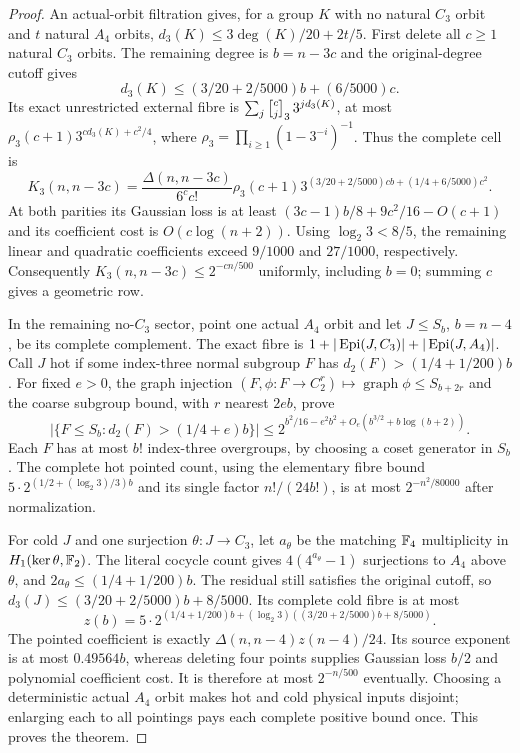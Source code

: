 \begin{proof}
An actual-orbit filtration gives, for a group $K$ with no natural
$C_3$ orbit and $t$ natural $A_4$ orbits,
$d_3(K)\leq3\deg(K)/20+2t/5$.
First delete all $c\geq1$ natural $C_3$ orbits. The remaining
degree is $b=n-3c$ and the original-degree cutoff gives
\[
 d_3(K)\leq(3/20+2/5000)b+(6/5000)c.
\]
Its exact unrestricted external fibre is
$\sum_j\gauss cj3\,3^{jd_3(K)}$, at most
$\rho_3(c+1)3^{cd_3(K)+c^2/4}$, where
$\rho_3=\prod_{i\geq1}(1-3^{-i})^{-1}$.
Thus the complete cell is
\[
 K_3(n,n-3c)=\frac{\Delta(n,n-3c)}{6^cc!}\rho_3(c+1)
  3^{(3/20+2/5000)cb+(1/4+6/5000)c^2}.
\]
At both parities its Gaussian loss is at least
$(3c-1)b/8+9c^2/16-O(c+1)$ and its coefficient cost is
$O(c\log(n+2))$. Using $\log_2 3<8/5$, the remaining
linear and quadratic coefficients exceed $9/1000$ and $27/1000$,
respectively. Consequently $K_3(n,n-3c)\leq2^{-cn/500}$
uniformly, including $b=0$; summing $c$ gives a geometric row.

In the remaining no-$C_3$ sector, point one actual $A_4$ orbit
and let $J\leq S_b$, $b=n-4$, be its complete complement.
The exact fibre is $1+|\operatorname{Epi}(J,C_3)|+|\operatorname{Epi}(J,A_4)|$.
Call $J$ hot if some index-three normal subgroup $F$ has
$d_2(F)>(1/4+1/200)b$. For fixed $e>0$, the graph injection
$(F,\phi:F\to C_2^r)\mapsto\operatorname{graph}\phi\leq S_{b+2r}$
and the coarse subgroup bound, with $r$ nearest $2eb$, prove
\[
 |\{F\leq S_b:d_2(F)>(1/4+e)b\}|
       \leq2^{b^2/16-e^2b^2+O_e(b^{3/2}+b\log(b+2))}.
\]
Each $F$ has at most $b!$ index-three overgroups, by choosing a
coset generator in $S_b$. The complete hot pointed count, using
the elementary fibre bound $5\cdot2^{(1/2+(\log_2 3)/3)b}$
and its single factor $n!/(24b!)$, is at most
$2^{-n^2/80000}$ after normalization.

For cold $J$ and one surjection $\theta:J\to C_3$, let
$a_\theta$ be the matching $\mathbb F_4$ multiplicity in
$H_1(\ker\theta,\mathbb F_2)$. The literal cocycle count gives
$4(4^{a_\theta}-1)$ surjections to $A_4$ above $\theta$,
and $2a_\theta\leq(1/4+1/200)b$.
The residual still satisfies the original cutoff, so
$d_3(J)\leq(3/20+2/5000)b+8/5000$.
Its complete cold fibre is at most
\[
 z(b)=5\cdot2^{(1/4+1/200)b+
             (\log_2 3)((3/20+2/5000)b+8/5000)}.
\]
The pointed coefficient is exactly $\Delta(n,n-4)z(n-4)/24$.
Its source exponent is at most $0.49564b$, whereas deleting four
points supplies Gaussian loss $b/2$ and polynomial coefficient
cost. It is therefore at most $2^{-n/500}$ eventually.
Choosing a deterministic actual $A_4$ orbit makes hot and cold
physical inputs disjoint; enlarging each to all pointings pays
each complete positive bound once. This proves the theorem.
\end{proof}
